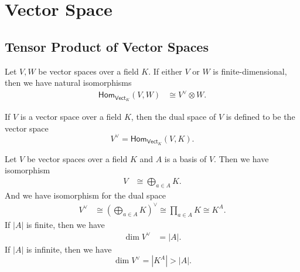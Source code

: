 \chapter{Vector Space}

\section{Tensor Product of Vector Spaces}
\begin{proposition}{}{}
    Let $V, W$ be vector spaces over a field $K$. If either $V$ or $W$ is finite-dimensional, then we have natural isomorphisms
    \[
        \begin{aligned}
            \mathsf{Hom}_{\mathsf{Vect}_K}(V, W) & \cong V^\vee\otimes W.
        \end{aligned}
    \]
\end{proposition}

If $V$ is a vector space over a field $K$, then the dual space of $V$ is defined to be the vector space
\[
    V^\vee = \mathsf{Hom}_{\mathsf{Vect}_K}(V, K).
\]

\begin{proposition}{}{}
    Let $V$ be vector spaces over a field $K$ and $A$ is a basis of $V$. Then we have isomorphism
    \[
        \begin{aligned}
            V & \cong \bigoplus_{a\in A} K.
        \end{aligned}
    \]
    And we have isomorphism for the dual space
    \[
        \begin{aligned}
            V^\vee & \cong\left( \bigoplus_{a\in A} K\right)^\vee\cong \prod_{a\in A} K\cong K^A.
        \end{aligned}
    \]
    If $|A|$ is finite, then we have
    \[
        \begin{aligned}
            \dim V^\vee & = |A|.
        \end{aligned}
    \]
    If $|A|$ is infinite, then we have
    \[
    \dim V^\vee = |K^A|> |A|.
    \]
\end{proposition}

